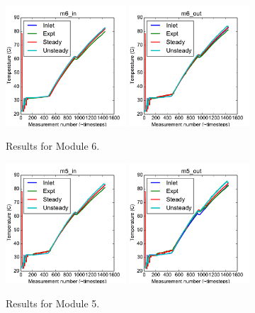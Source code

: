 \documentclass{article}
\begin{document}
\begin{figure}[!ht]
\centering
\includegraphics[width=0.4\textwidth]{../../data/ICSolar/images/Feb28_m6_in_compare.pdf}\hspace{0.05\textwidth}
\includegraphics[width=0.4\textwidth]{../../data/ICSolar/images/Feb28_m6_out_compare.pdf}\hspace{0.05\textwidth}\\
\caption{Results for Module 6.}\end{figure}
\begin{figure}[!ht]
\centering
\includegraphics[width=0.4\textwidth]{../../data/ICSolar/images/Feb28_m5_in_compare.pdf}\hspace{0.05\textwidth}
\includegraphics[width=0.4\textwidth]{../../data/ICSolar/images/Feb28_m5_out_compare.pdf}\hspace{0.05\textwidth}\\
\caption{Results for Module 5.}\end{figure}
\end{document}
